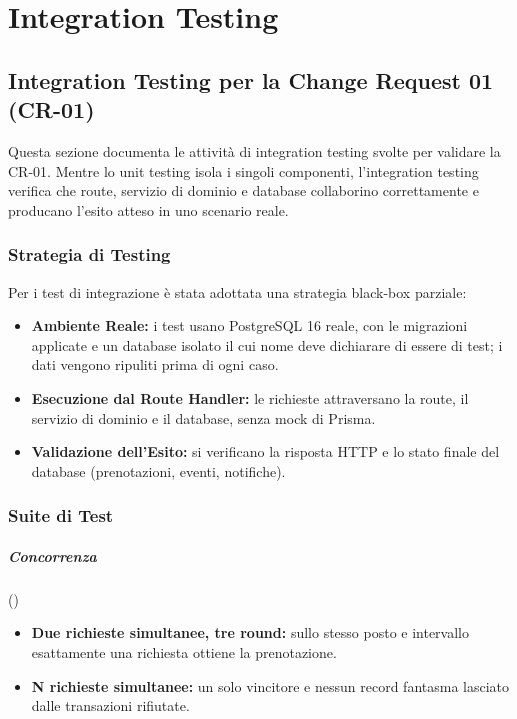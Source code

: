\documentclass[11pt,a4paper,oneside,openany]{book}
\begin{document}
\chapter{Integration Testing}

\section{Integration Testing per la Change Request 01 (CR-01)}

Questa sezione documenta le attività di integration testing svolte per
validare la CR-01. Mentre lo unit testing isola i singoli componenti,
l'integration testing verifica che route, servizio di dominio e database
collaborino correttamente e producano l'esito atteso in uno scenario reale.

\subsection{Strategia di Testing}

Per i test di integrazione è stata adottata una strategia black-box parziale:
\begin{itemize}
  \item \textbf{Ambiente Reale:} i test usano PostgreSQL 16 reale, con le
        migrazioni applicate e un database isolato il cui nome deve
        dichiarare di essere di test; i dati vengono ripuliti prima di ogni
        caso.
  \item \textbf{Esecuzione dal Route Handler:} le richieste attraversano la
        route, il servizio di dominio e il database, senza mock di Prisma.
  \item \textbf{Validazione dell'Esito:} si verificano la risposta HTTP e lo
        stato finale del database (prenotazioni, eventi, notifiche).
\end{itemize}

\subsection{Suite di Test}

\paragraph{Concorrenza} ()
\begin{itemize}
  \item \textbf{Due richieste simultanee, tre round:} sullo stesso posto e
        intervallo esattamente una richiesta ottiene la prenotazione.
  \item \textbf{N richieste simultanee:} un solo vincitore e nessun record
        fantasma lasciato dalle transazioni rifiutate.
\end{itemize}
\end{document}
